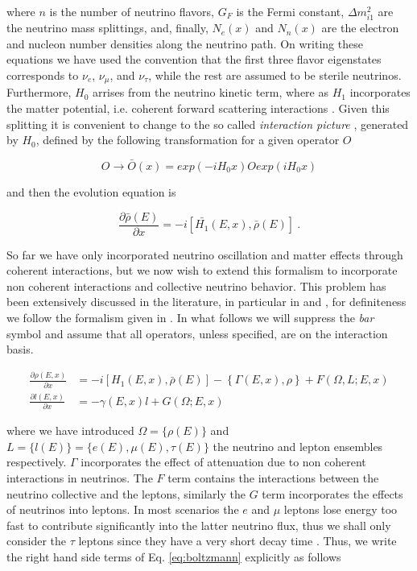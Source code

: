\documentclass[3p,12pt,authoryear]{elsarticle}
\newcommand{\pa}[2]{\frac{\partial #1}{\partial #2}}
\begin{document}
where $n$ is the number of neutrino flavors, $G_F$ is the Fermi constant, $\Delta m^2_{i1}$ are the neutrino mass splittings, and, finally, $N_e(x)$ and $N_n(x)$ are the electron and nucleon number densities along the neutrino path. On writing these equations we have used the convention that the first three flavor eigenstates corresponds to $\nu_e$, $\nu_\mu$, and $\nu_\tau$, while the rest are assumed to be sterile neutrinos. Furthermore, $H_0$ arrises from the neutrino kinetic term, where as $H_1$ incorporates the matter potential, i.e. coherent forward scattering interactions \citep{Mikheev:1986gs,Mikheev:1986wj,Wolfenstein:1977ue}. Given this splitting it is convenient to change to the so called {\it interaction picture} , generated by $H_0$, defined by the following transformation for a given operator $O$

\begin{equation}
O \to \bar{O}(x)=exp(-iH_0x)Oexp(iH_0x)
\end{equation}

and then the evolution equation is

\begin{equation}
\pa{\bar{\rho}(E)}{x} = -i [ \bar{H_1} (E,x), \bar{\rho}(E) ]~.
\label{eq:schrodinger}
\end{equation}

So far we have only incorporated neutrino oscillation and matter effects through coherent interactions, but we now wish to extend this formalism to incorporate non coherent interactions and collective neutrino behavior. This problem has been extensively discussed in the literature, in particular in \citep{Duan:2010tk,Strack:qd,Zhang:2013ay} and \citep{Cirelli:mw,Blennow:2007tw,Arguelles:2012cf}, for definiteness we follow the formalism given in \citep{Gonzalez-Garcia:2005xw}. In what follows we will suppress the {\it bar} symbol and assume that all operators, unless specified, are on the interaction basis. 

\begin{subequations}
\label{eq:boltzmann}
\begin{align}
\pa{\rho(E,x)}{x} &= -i [ H_1 (E,x), \bar{\rho}(E) ] - \left\{ \Gamma(E,x), \rho \right\} + F(\Omega,L;E,x) \\
\pa{l(E,x)}{x} &= - \gamma(E,x)l + G(\Omega;E,x)
\end{align}
\end{subequations}

where we have introduced $\Omega = \{\rho(E)\} $ and $ L = \{ l(E) \} = \{ e(E), \mu(E), \tau(E) \}$ the neutrino and lepton ensembles respectively. $\Gamma$ incorporates the effect of attenuation due to non coherent interactions in neutrinos. The $F$ term contains the interactions between the neutrino collective and the leptons, similarly the $G$ term incorporates the effects of neutrinos into leptons. In most scenarios the $e$ and $\mu$ leptons lose energy too fast to contribute significantly into the latter neutrino flux, thus we shall only consider the $\tau$ leptons since they have a very short decay time \citep{Halzen:kq}. Thus, we write the right hand side terms of Eq. \eqref{eq:boltzmann}  explicitly as follows
\end{document}
